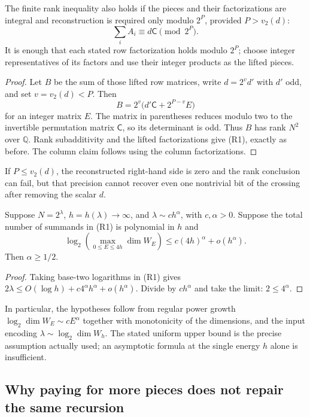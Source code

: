 \begin{proposition}
The finite rank inequality also holds if the pieces and their
factorizations are integral and reconstruction is required only modulo
$2^P$, provided $P>v_2(d)$:
\[
 \sum_i A_i\equiv d\mathsf C\pmod{2^P}.
\]
It is enough that each stated row factorization holds modulo $2^P$;
choose integer representatives of its factors and use their integer
products as the lifted pieces.
\end{proposition}
\begin{proof}
Let $B$ be the sum of those lifted row matrices, write
$d=2^v d'$ with $d'$ odd, and set $v=v_2(d)<P$.
Then
\[
 B=2^v\bigl(d'\mathsf C+2^{P-v}E\bigr)
\]
for an integer matrix $E$.  The matrix in parentheses reduces modulo
two to the invertible permutation matrix $\mathsf C$, so its determinant
is odd.  Thus $B$ has rank $N^2$ over $\mathbb Q$.
Rank subadditivity and the lifted factorizations give (R1), exactly as
before.  The column claim follows using the column factorizations.
\end{proof}
If $P\le v_2(d)$, the reconstructed right-hand side is zero and the
rank conclusion can fail, but that precision cannot recover even one
nontrivial bit of the crossing after removing the scalar $d$.


\begin{corollary}
Suppose $N=2^\lambda$, $h=h(\lambda)\to\infty$, and
$\lambda\sim c h^\alpha$, with $c,\alpha>0$.
Suppose the total number of summands in (R1) is polynomial in $h$ and
\[
 \log_2\!\left(\max_{0\le E\le4h}\dim W_E\right)
 \le c(4h)^\alpha+o(h^\alpha).
\]
Then $\alpha\ge1/2$.
\end{corollary}

\begin{proof}
Taking base-two logarithms in (R1) gives
$2\lambda\le O(\log h)+c4^\alpha h^\alpha+o(h^\alpha)$.
Divide by $c h^\alpha$ and take the limit: $2\le4^\alpha$.
\end{proof}

In particular, the hypotheses follow from regular power growth
$\log_2\dim W_E\sim cE^\alpha$ together with monotonicity of the dimensions,
and the input encoding $\lambda\sim\log_2\dim W_h$.
The stated uniform upper bound is the precise assumption actually used;
an asymptotic formula at the single energy $h$ alone is insufficient.

\subsection{Why paying for more pieces does not repair the same recursion}


